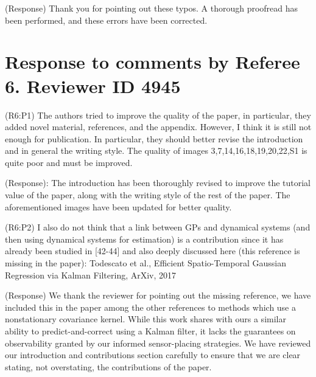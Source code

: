 \documentclass{letter}
\begin{document}
{\color{red}(Response)} Thank you for pointing out these typos. A thorough proofread has been performed, and these errors have been corrected.



\section{Response to comments by Referee 6. Reviewer ID 4945}

{\color{red}(R6:P1)} The authors tried to improve the quality of the paper, in particular, they added novel material, references, and the appendix. However, I think it is still not enough for publication. In particular, they should better revise the introduction and in general the writing style. The quality of images 3,7,14,16,18,19,20,22,S1 is quite poor and must be improved. 

{\color{red}(Response)}: The introduction has been thoroughly revised to improve the tutorial value of the paper, along with the writing style of the rest of the paper. The aforementioned images have been updated for better quality.


{\color{red}(R6:P2)} I also do not think that a link between GPs and dynamical systems (and then using dynamical systems for estimation) is a contribution since it has already been studied in [42-44] and also deeply discussed here (this reference is missing in the paper): Todescato et al., Efficient Spatio-Temporal Gaussian Regression via Kalman Filtering, ArXiv, 2017

{\color{red}(Response)} We thank the reviewer for pointing out the missing reference, we have included this in the paper among the other references to methods which use a nonstationary covariance kernel. While this work shares with ours a similar ability to predict-and-correct using a Kalman filter, it lacks the guarantees on observability granted by our informed sensor-placing strategies. We have reviewed our introduction and contributions section carefully to ensure that we are clear stating, not overstating, the contributions of the paper.
\end{document}
